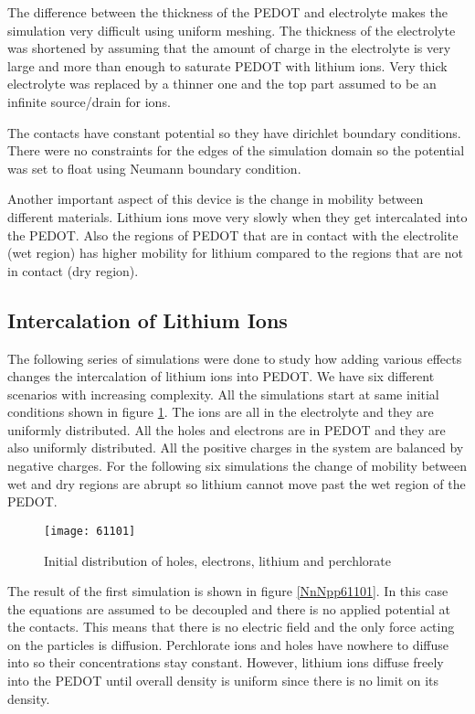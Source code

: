 The difference between the thickness of the PEDOT and electrolyte makes the simulation very difficult using uniform meshing. The thickness of the electrolyte was shortened by assuming that the amount of charge in the electrolyte is very large and more than enough to saturate PEDOT with lithium ions. Very thick electrolyte was replaced by a thinner one and the top part assumed to be an infinite source/drain for ions.

The contacts have constant potential so they have dirichlet boundary conditions. There were no constraints for the edges of the simulation domain so the potential was set to float using Neumann boundary condition.

Another important aspect of this device is the change in mobility between different materials. Lithium ions move very slowly when they get intercalated into the PEDOT. Also the regions of PEDOT that are in contact with the electrolite (wet region) has higher mobility for lithium compared to the regions that are not in contact (dry region).

\clearpage
\subsection{Intercalation of Lithium Ions}

The following series of simulations were done to study how adding various effects changes the intercalation of lithium ions into PEDOT. We have six different scenarios with increasing complexity. All the simulations start at same initial conditions shown in figure \ref{61101}. The ions are all in the electrolyte and they are uniformly distributed. All the holes and electrons are in PEDOT and they are also uniformly distributed. All the positive charges in the system are balanced by negative charges. For the following six simulations the change of mobility between wet and dry regions are abrupt so lithium cannot move past the wet region of the PEDOT.

\begin{figure}[!htp]
\centering
\texttt{[image: 61101]}
\caption{Initial distribution of holes, electrons, lithium and perchlorate } 
\label{61101}
\end{figure}

The result of the first simulation is shown in figure \ref{NnNpp61101}. In this case the equations are assumed to be decoupled and there is no applied potential at the contacts. This means that there is no electric field and the only force acting on the particles is diffusion. Perchlorate ions and holes have nowhere to diffuse into so their concentrations stay constant. However, lithium ions diffuse freely into the PEDOT until overall density is uniform since there is no limit on its density. 


